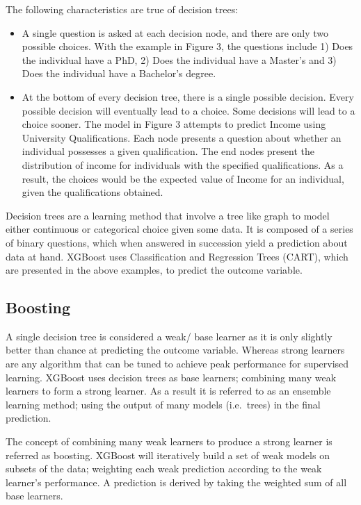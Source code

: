 \documentclass[]{book}
\providecommand{\tightlist}{%
  \setlength{\itemsep}{0pt}\setlength{\parskip}{0pt}}
\begin{document}
The following characteristics are true of decision trees:

\begin{itemize}
\tightlist
\item
  A single question is asked at each decision node, and there are only
  two possible choices. With the example in Figure 3, the questions
  include 1) Does the individual have a PhD, 2) Does the individual have
  a Master's and 3) Does the individual have a Bachelor's degree.\\
\item
  At the bottom of every decision tree, there is a single possible
  decision. Every possible decision will eventually lead to a choice.
  Some decisions will lead to a choice sooner. The model in Figure 3
  attempts to predict Income using University Qualifications. Each node
  presents a question about whether an individual possesses a given
  qualification. The end nodes present the distribution of income for
  individuals with the specified qualifications. As a result, the
  choices would be the expected value of Income for an individual, given
  the qualifications obtained.
\end{itemize}

Decision trees are a learning method that involve a tree like graph to
model either continuous or categorical choice given some data. It is
composed of a series of binary questions, which when answered in
succession yield a prediction about data at hand. XGBoost uses
Classification and Regression Trees (CART), which are presented in the
above examples, to predict the outcome variable.

\subsection{Boosting}\label{boosting}

A single decision tree is considered a weak/ base learner as it is only
slightly better than chance at predicting the outcome variable. Whereas
strong learners are any algorithm that can be tuned to achieve peak
performance for supervised learning. XGBoost uses decision trees as base
learners; combining many weak learners to form a strong learner. As a
result it is referred to as an ensemble learning method; using the
output of many models (i.e.~trees) in the final prediction.

The concept of combining many weak learners to produce a strong learner
is referred as boosting. XGBoost will iteratively build a set of weak
models on subsets of the data; weighting each weak prediction according
to the weak learner's performance. A prediction is derived by taking the
weighted sum of all base learners.
\end{document}
